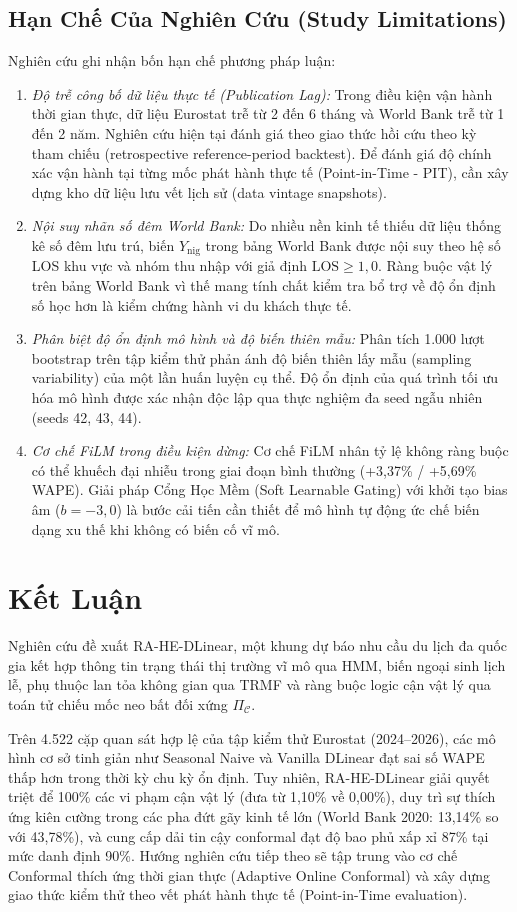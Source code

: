 \documentclass[10pt,journal,compsoc]{IEEEtran}
\begin{document}
\subsection{Hạn Chế Của Nghiên Cứu (Study Limitations)}
Nghiên cứu ghi nhận bốn hạn chế phương pháp luận:
\begin{enumerate}
    \item \textit{Độ trễ công bố dữ liệu thực tế (Publication Lag):} Trong điều kiện vận hành thời gian thực, dữ liệu Eurostat trễ từ 2 đến 6 tháng và World Bank trễ từ 1 đến 2 năm. Nghiên cứu hiện tại đánh giá theo giao thức hồi cứu theo kỳ tham chiếu (retrospective reference-period backtest). Để đánh giá độ chính xác vận hành tại từng mốc phát hành thực tế (Point-in-Time - PIT), cần xây dựng kho dữ liệu lưu vết lịch sử (data vintage snapshots).
    \item \textit{Nội suy nhãn số đêm World Bank:} Do nhiều nền kinh tế thiếu dữ liệu thống kê số đêm lưu trú, biến $Y_{\text{nig}}$ trong bảng World Bank được nội suy theo hệ số LOS khu vực và nhóm thu nhập với giả định $\text{LOS} \ge 1{,}0$. Ràng buộc vật lý trên bảng World Bank vì thế mang tính chất kiểm tra bổ trợ về độ ổn định số học hơn là kiểm chứng hành vi du khách thực tế.
    \item \textit{Phân biệt độ ổn định mô hình và độ biến thiên mẫu:} Phân tích 1.000 lượt bootstrap trên tập kiểm thử phản ánh độ biến thiên lấy mẫu (sampling variability) của một lần huấn luyện cụ thể. Độ ổn định của quá trình tối ưu hóa mô hình được xác nhận độc lập qua thực nghiệm đa seed ngẫu nhiên (seeds 42, 43, 44).
    \item \textit{Cơ chế FiLM trong điều kiện dừng:} Cơ chế FiLM nhân tỷ lệ không ràng buộc có thể khuếch đại nhiễu trong giai đoạn bình thường (+3,37\% / +5,69\% WAPE). Giải pháp Cổng Học Mềm (Soft Learnable Gating) với khởi tạo bias âm ($b=-3{,}0$) là bước cải tiến cần thiết để mô hình tự động ức chế biến dạng xu thế khi không có biến cố vĩ mô.
\end{enumerate}

\section{Kết Luận}
Nghiên cứu đề xuất RA-HE-DLinear, một khung dự báo nhu cầu du lịch đa quốc gia kết hợp thông tin trạng thái thị trường vĩ mô qua HMM, biến ngoại sinh lịch lễ, phụ thuộc lan tỏa không gian qua TRMF và ràng buộc logic cận vật lý qua toán tử chiếu mốc neo bất đối xứng $\Pi_{\mathcal{C}}$.

Trên 4.522 cặp quan sát hợp lệ của tập kiểm thử Eurostat (2024--2026), các mô hình cơ sở tinh giản như Seasonal Naive và Vanilla DLinear đạt sai số WAPE thấp hơn trong thời kỳ chu kỳ ổn định. Tuy nhiên, RA-HE-DLinear giải quyết triệt để 100\% các vi phạm cận vật lý (đưa từ 1,10\% về 0,00\%), duy trì sự thích ứng kiên cường trong các pha đứt gãy kinh tế lớn (World Bank 2020: 13,14\% so với 43,78\%), và cung cấp dải tin cậy conformal đạt độ bao phủ xấp xỉ 87\% tại mức danh định 90\%. Hướng nghiên cứu tiếp theo sẽ tập trung vào cơ chế Conformal thích ứng thời gian thực (Adaptive Online Conformal) và xây dựng giao thức kiểm thử theo vết phát hành thực tế (Point-in-Time evaluation).
\end{document}
